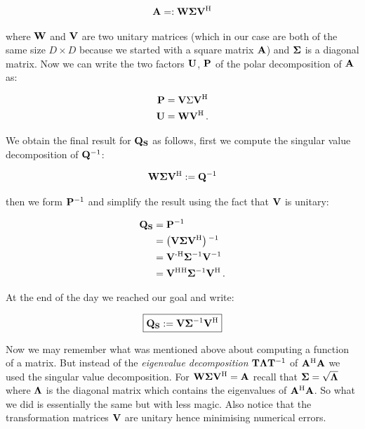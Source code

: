 \begin{align*}
  \mathbf{A} =: \mathbf{W} \mathbf{\Sigma} \mathbf{V}{}^{\textnormal{H}}
\end{align*}

where $\mathbf{W}$ and $\mathbf{V}$ are two unitary matrices (which in our case are both of the same
size $D \times D$ because we started with a square matrix $\mathbf{A}$) and $\mathbf{\Sigma}$ is a
diagonal matrix. Now we can write the two factors $\mathbf{U}$, $\mathbf{P}$ of the
polar decomposition of $\mathbf{A}$ as:

\begin{align*}
  \mathbf{P} & = \mathbf{V} \Sigma \mathbf{V}{}^{\textnormal{H}} \\
  \mathbf{U} & = \mathbf{W} \mathbf{V}{}^{\textnormal{H}} \,.
\end{align*}

We obtain the final result for $\mathbf{Q_S}$ as follows, first we compute the singular
value decomposition of $\mathbf{Q}{}^{-1}$:

\begin{equation*}
  \mathbf{W} \mathbf{\Sigma} \mathbf{V}{}^{\textnormal{H}} := \mathbf{Q}{}^{-1}
\end{equation*}

then we form $\mathbf{P}{}^{-1}$ and simplify the result using the fact that $\mathbf{V}$ is unitary:

\begin{align*}
  \mathbf{Q_S} & = \mathbf{P}{}^{-1} \\
      & = \left( \mathbf{V} \mathbf{\Sigma} \mathbf{V}{}^{\textnormal{H}} \right){}^{-1} \\
      & = \mathbf{V}{}^{\textnormal{-H}} \mathbf{\Sigma}{}^{-1} \mathbf{V}{}^{-1} \\
      & = \mathbf{V}{}^{\textnormal{H}}{}^{\textnormal{H}} \mathbf{\Sigma}{}^{-1} \mathbf{V}{}^{\textnormal{H}} \,.
\end{align*}

At the end of the day we reached our goal and write:

\begin{equation*}
\boxed{
  \mathbf{Q_S} := \mathbf{V} \mathbf{\Sigma}{}^{-1} \mathbf{V}{}^{\textnormal{H}}
}
\end{equation*}

Now we may remember what was mentioned above about computing a function of a matrix.
But instead of the \emph{eigenvalue decomposition} $\mathbf{T} \mathbf{\Lambda} \mathbf{T}{}^{-1}$
of $\mathbf{A}{}^{\textnormal{H}} \mathbf{A}$ we used the singular value decomposition. For $\mathbf{W} \mathbf{\Sigma} \mathbf{V}{}^{\textnormal{H}} = \mathbf{A}$
recall that $\mathbf{\Sigma} = \sqrt{\mathbf{\Lambda}}$ where $\mathbf{\Lambda}$ is the
diagonal matrix which contains the eigenvalues of $\mathbf{A}{}^{\textnormal{H}} \mathbf{A}$. So what we
did is essentially the same but with less magic. Also notice that the transformation
matrices $\mathbf{V}$ are unitary hence minimising numerical errors.

